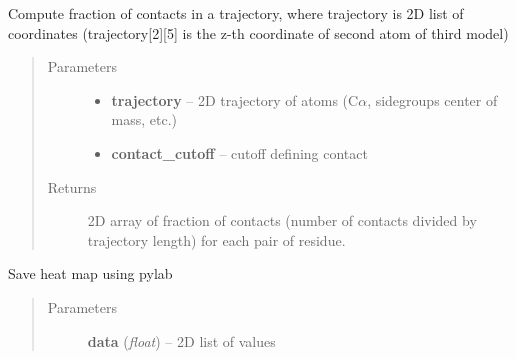 \documentclass[letterpaper,10pt,english]{sphinxmanual}
\begin{document}
\begin{fulllineitems}
\label{api:pycabs.contact_map}
Compute fraction of contacts in a trajectory, where trajectory is 2D list of coordinates (trajectory{[}2{]}{[}5{]} is the z-th coordinate of second atom of third model)
\begin{quote}\begin{description}
\item[{Parameters}] \leavevmode\begin{itemize}
\item {} 
\textbf{trajectory} -- 2D trajectory of atoms (C\(\alpha\), sidegroups center of mass, etc.)

\item {} 
\textbf{contact\_cutoff} -- cutoff defining contact

\end{itemize}

\item[{Returns}] \leavevmode
2D array of fraction of contacts (number of contacts divided by trajectory length) for each pair of residue.

\end{description}\end{quote}

\end{fulllineitems}


\begin{fulllineitems}
\label{api:pycabs.heat_map}
Save heat map using pylab
\begin{quote}\begin{description}
\item[{Parameters}] \leavevmode
\textbf{data} (\emph{float}) -- 2D list of values

\end{description}\end{quote}

\end{fulllineitems}

\end{document}
